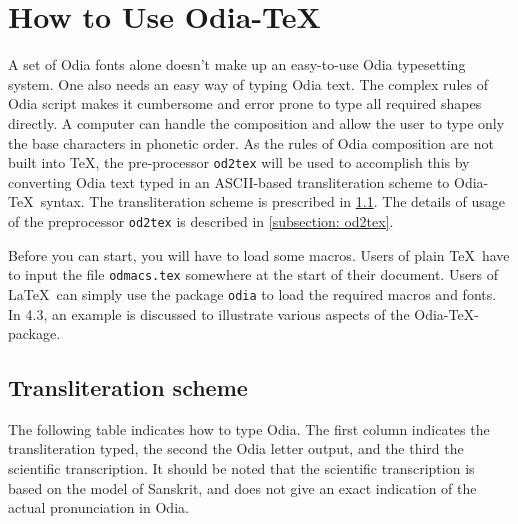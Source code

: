 \documentclass[12pt]{article}
\def\odtex{Odia-\TeX}
\begin{document}
\section{How to Use \odtex{}}
A set of Odia fonts alone doesn't make up an easy-to-use Odia typesetting system.
One also needs an easy way of typing Odia text. The complex
rules of Odia script makes it cumbersome and error prone to type all
required shapes directly. A computer can handle the composition and allow
the user to type only the base characters in phonetic order. As the rules of
Odia composition are not built into \TeX, the pre-processor {\tt od2tex} will be used to accomplish
this by converting Odia text typed in an ASCII-based transliteration scheme to \odtex\ syntax. The transliteration scheme is
prescribed in \ref{subsection: transliterate}. The details of usage of the preprocessor {\tt od2tex} is described in \ref{subsection: od2tex}.

Before you can start, you will have to load some macros.
Users of plain \TeX\ have to input the file {\tt odmacs.tex} somewhere at the
start of their document. Users of \LaTeX\ can simply use the package {\tt odia} to load the
required macros and fonts. In 4.3, an example is discussed to illustrate various aspects of 
the \odtex-package.




\subsection{Transliteration scheme}
\label{subsection: transliterate}
The following table indicates how to type Odia. The first column indicates the
transliteration typed, the second the Odia letter output, and the third the
scientific transcription. It should be noted that the scientific transcription
is based on the model of Sanskrit, and does not give an exact indication of the
actual pronunciation in Odia.
\vskip 5mm
\end{document}
